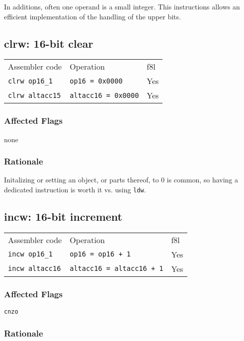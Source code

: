 \documentclass{book}
\begin{document}
In additions, often one operand is a small integer. This instructions allows an efficient implementation of the handling of the upper bits.


\subsection{clrw: 16-bit clear}

\begin{tabular}{l l l}
Assembler code         & Operation                  & f8l \\
\texttt{clrw op16\_1}  & \texttt{op16 = 0x0000}     & Yes \\
\texttt{clrw altacc15} & \texttt{altacc16 = 0x0000} & Yes
\end{tabular}

\subsubsection*{Affected Flags}

none

\subsubsection*{Rationale}

Initalizing or setting an object, or parts thereof, to 0 is common, so having a dedicated instruction is worth it vs. using \texttt{ldw}.


\subsection{incw: 16-bit increment}

\begin{tabular}{l l l}
Assembler code         & Operation                        & f8l \\
\texttt{incw op16\_1}  & \texttt{op16 = op16 + 1}         & Yes \\
\texttt{incw altacc16} & \texttt{altacc16 = altacc16 + 1} & Yes
\end{tabular}

\subsubsection*{Affected Flags}

\texttt{cnzo}

\subsubsection*{Rationale}
\end{document}

